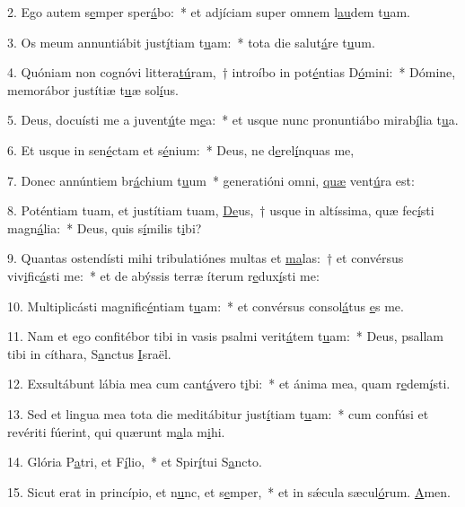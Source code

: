 2. Ego autem s\uline{e}mper sper\uline{á}bo:~* et adjíciam super omnem l\uline{au}dem t\uline{u}am.\par 
3. Os meum annuntiábit just\uline{í}tiam t\uline{u}am:~* tota die salut\uline{á}re t\uline{u}um.\par 
4. Quóniam non cognóvi littera\uline{tú}ram,~† introíbo in pot\uline{é}ntias D\uline{ó}mini:~* Dómine, memorábor justítiæ t\uline{u}æ sol\uline{í}us.\par 
5. Deus, docuísti me a juvent\uline{ú}te m\uline{e}a:~* et usque nunc pronuntiábo mirab\uline{í}lia t\uline{u}a.\par 
6. Et usque in sen\uline{é}ctam et s\uline{é}nium:~* Deus, ne d\uline{e}rel\uline{í}nquas me,\par 
7. Donec annúntiem br\uline{á}chium t\uline{u}um~* generatióni omni, \uline{quæ} vent\uline{ú}ra est:\par 
8. Poténtiam tuam, et justítiam tuam, \uline{De}us,~† usque in altíssima, quæ fec\uline{í}sti magn\uline{á}lia:~* Deus, quis s\uline{í}milis t\uline{i}bi?\par 
9. Quantas ostendísti mihi tribulatiónes multas et \uline{ma}las:~† et convérsus viv\uline{i}fic\uline{á}sti me:~* et de abýssis terræ íterum r\uline{e}dux\uline{í}sti me:\par 
10. Multiplicásti magnific\uline{é}ntiam t\uline{u}am:~* et convérsus consol\uline{á}tus \uline{e}s me.\par 
11. Nam et ego confitébor tibi in vasis psalmi verit\uline{á}tem t\uline{u}am:~* Deus, psallam tibi in cíthara, S\uline{a}nctus \uline{I}sraël.\par 
12. Exsultábunt lábia mea cum cant\uline{á}vero t\uline{i}bi:~* et ánima mea, quam r\uline{e}dem\uline{í}sti.\par 
13. Sed et lingua mea tota die meditábitur just\uline{í}tiam t\uline{u}am:~* cum confúsi et revériti fúerint, qui quærunt m\uline{a}la m\uline{i}hi.\par 
14. Glória P\uline{a}tri, et F\uline{í}lio,~* et Spir\uline{í}tui S\uline{a}ncto.\par 
15. Sicut erat in princípio, et n\uline{u}nc, et s\uline{e}mper,~* et in sǽcula sæcul\uline{ó}rum. \uline{A}men.\par 
